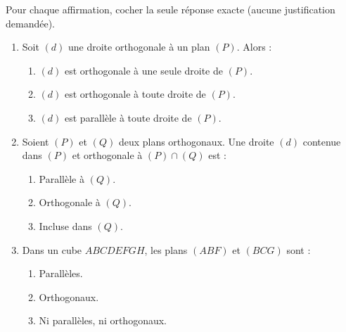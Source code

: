 \documentclass[11pt]{article}
\begin{document}
\begin{exercice}
Pour chaque affirmation, cocher la seule réponse exacte (aucune justification demandée).
\begin{enumerate}
    \item Soit $(d)$ une droite orthogonale à un plan $(P)$. Alors :
    \begin{enumerate}
        \item $(d)$ est orthogonale à une seule droite de $(P)$.
        \item $(d)$ est orthogonale à toute droite de $(P)$.
        \item $(d)$ est parallèle à toute droite de $(P)$.
    \end{enumerate}
    \item Soient $(P)$ et $(Q)$ deux plans orthogonaux. Une droite $(d)$ contenue dans $(P)$ et orthogonale à $(P) \cap (Q)$ est :
    \begin{enumerate}
        \item Parallèle à $(Q)$.
        \item Orthogonale à $(Q)$.
        \item Incluse dans $(Q)$.
    \end{enumerate}
    \item Dans un cube $ABCDEFGH$, les plans $(ABF)$ et $(BCG)$ sont :
    \begin{enumerate}
        \item Parallèles.
        \item Orthogonaux.
        \item Ni parallèles, ni orthogonaux.
    \end{enumerate}
\end{enumerate}
\end{exercice}
\end{document}
